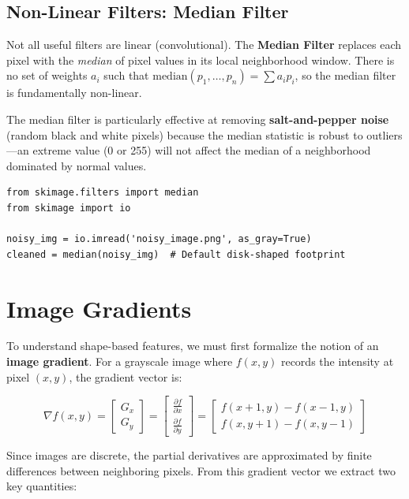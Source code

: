 \subsection*{Non-Linear Filters: Median Filter}

Not all useful filters are linear (convolutional). The \textbf{Median Filter} replaces each pixel with the \textit{median} of pixel values in its local neighborhood window. There is no set of weights $a_i$ such that $\text{median}(p_1, \ldots, p_n) = \sum a_i p_i$, so the median filter is fundamentally non-linear.

The median filter is particularly effective at removing \textbf{salt-and-pepper noise} (random black and white pixels) because the median statistic is robust to outliers---an extreme value (0 or 255) will not affect the median of a neighborhood dominated by normal values.

\begin{lstlisting}[style=pythonstyle]
from skimage.filters import median
from skimage import io

noisy_img = io.imread('noisy_image.png', as_gray=True)
cleaned = median(noisy_img)  # Default disk-shaped footprint
\end{lstlisting}

\section*{Image Gradients}

To understand shape-based features, we must first formalize the notion of an \textbf{image gradient}. For a grayscale image where $f(x, y)$ records the intensity at pixel $(x, y)$, the gradient vector is:

$$
\nabla f(x, y) = \begin{bmatrix} G_x \\ G_y \end{bmatrix} = \begin{bmatrix} \frac{\partial f}{\partial x} \\[6pt] \frac{\partial f}{\partial y} \end{bmatrix} = \begin{bmatrix} f(x+1, y) - f(x-1, y) \\ f(x, y+1) - f(x, y-1) \end{bmatrix}
$$

Since images are discrete, the partial derivatives are approximated by finite differences between neighboring pixels. From this gradient vector we extract two key quantities:

